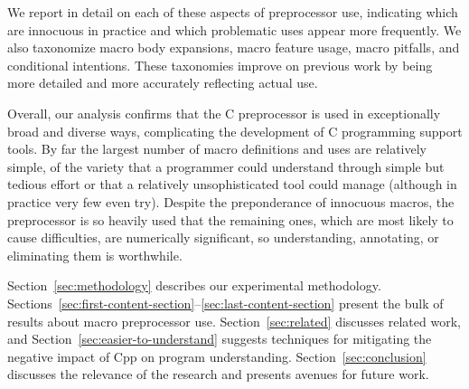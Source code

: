 \documentclass[10pt]{article}
\begin{document}
We report in detail on each of these aspects of preprocessor use,
indicating which are innocuous in practice and which problematic
uses appear more frequently.  We also taxonomize macro body
expansions, macro feature usage, macro pitfalls, and conditional
intentions.  These taxonomies improve on previous work by being more
detailed and more accurately reflecting actual use.

Overall, our analysis confirms that the C preprocessor is used in
exceptionally broad and diverse ways, complicating the development of C
programming support tools.  By far the largest number of macro definitions
and uses are relatively simple, of the variety that a programmer could
understand through simple but tedious effort or that a relatively
unsophisticated tool could manage (although in practice very few even
try).  Despite the preponderance of innocuous macros, the preprocessor is
so heavily used that the remaining ones, which are most likely to cause
difficulties, are numerically significant, so understanding, annotating, or
eliminating them is worthwhile.

Section~\ref{sec:methodology} describes our experimental methodology.
Sections~\ref{sec:first-content-section}--\ref{sec:last-content-section}
present the bulk of results about macro preprocessor use.
Section~\ref{sec:related} discusses related work, and
Section~\ref{sec:easier-to-understand} suggests techniques for mitigating
the negative impact of Cpp on program understanding.
Section~\ref{sec:conclusion} discusses the relevance of the research and
presents avenues for future work.

\end{document}
